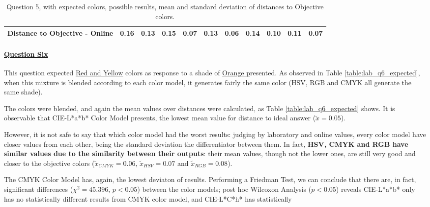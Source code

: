 \begin{table}[H]
{\begin{tabular}{lccccccccccccc}
    \multicolumn{4}{l}{Distance to Objective - Online}                                                                                               & \multicolumn{1}{|c}{0.16}        & \multicolumn{1}{c|}{0.13}    & \multicolumn{1}{|c}{0.15}        & \multicolumn{1}{c|}{0.07}    & \multicolumn{1}{|c}{\textbf{0.13}}       & \multicolumn{1}{c|}{0.06}    & \multicolumn{1}{|c}{0.14}        & \multicolumn{1}{c|}{0.10}    & \multicolumn{1}{|c}{0.11}       & \multicolumn{1}{c|}{0.07}    \\ \hline
    \end{tabular}}
  \caption[Question 5, with expected Results.]{Question 5, with expected colors, possible results, mean and standard deviation of distances to Objective colors.}
  \label{table:lab_q5_expected}
\end{table}
%
\paragraph{\ul{Question Six}}
%
This question expected \ul{Red and Yellow} colors as response to a shade of \ul{Orange p}resented. As observed in Table \ref{table:lab_q6_expected}, when this mixture is blended according
to each color model, it generates fairly the same color (HSV, RGB and CMYK all generate the same shade). \par
%
The colors were blended, and again the mean values over distances were calculated, as Table \ref{table:lab_q6_expected} shows. It is observable that CIE-L*a*b* Color Model presents,
the lowest mean value for distance to ideal answer ($\tilde{x} = 0.05$). \par
%
However, it is not safe to say that which color model had the worst results: judging by laboratory and online values, every color model have closer values from each other, being the
standard deviation the differentiator between them. In fact, \textbf{HSV, CMYK and RGB have similar values due to the similarity between their outputs}: their mean values, though not
the lower ones, are still very good and closer to the objective colors ($\tilde{x}_{CMYK} = 0.06$, $\tilde{x}_{HSV} = 0.07$ and $\tilde{x}_{RGB} = 0.08$). \par
%
The CMYK Color Model has, again, the lowest deviaton of results. Performing a Friedman Test, we can conclude that there are, in fact, significant differences ($\chi^2 = 45.396$, $p < 0.05$)
between the color models; post hoc Wilcoxon Analysis ($p < 0.05$) reveals CIE-L*a*b* only has no statistically different results from CMYK color model, and CIE-L*C*h* has statistically
